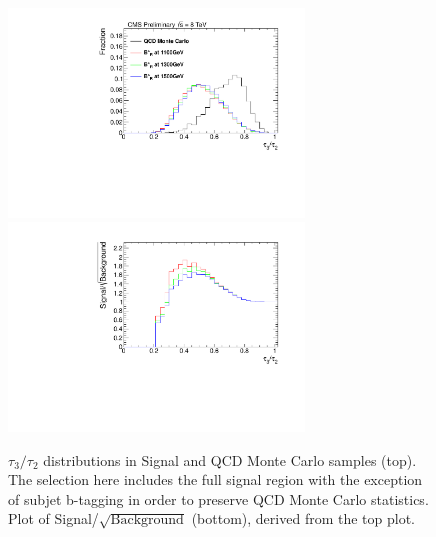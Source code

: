 \begin{figure}[htcb]
\begin{center}
\includegraphics[width=0.7\textwidth]{AN-14-049/figs/tau32rightCompqcdandsignal.pdf}\\
\includegraphics[width=0.7\textwidth]{AN-14-049/figs/tau32rightSNRqcdandsignal.pdf}
\caption{
$\tau_3/\tau_2$ distributions in Signal and QCD Monte Carlo samples (top).  The selection here includes the full signal region with the exception of subjet b-tagging in order to preserve QCD Monte Carlo statistics.  Plot of Signal/$\sqrt{\text{Background}}$ (bottom), derived from the top plot.
}
\label{figs:bsNsubCOMP}
\end{center}
\end{figure}




